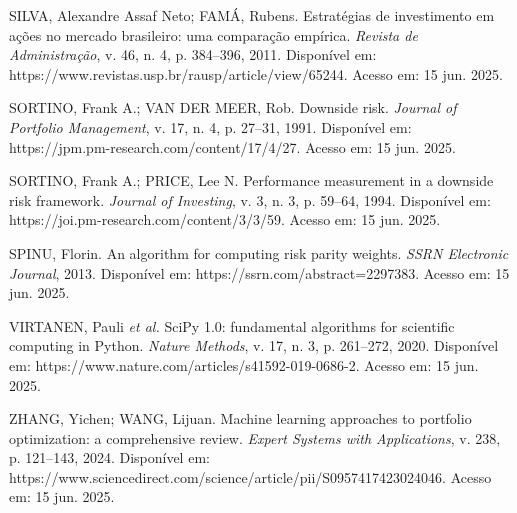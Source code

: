 \noindent
SILVA, Alexandre Assaf Neto; FAMÁ, Rubens. Estratégias de investimento em ações no mercado brasileiro: uma comparação empírica. \textit{Revista de Administração}, v. 46, n. 4, p. 384--396, 2011. Disponível em: https://www.revistas.usp.br/rausp/article/view/65244. Acesso em: 15 jun. 2025.

\noindent
SORTINO, Frank A.; VAN DER MEER, Rob. Downside risk. \textit{Journal of Portfolio Management}, v. 17, n. 4, p. 27--31, 1991. Disponível em: https://jpm.pm-research.com/content/17/4/27. Acesso em: 15 jun. 2025.

\noindent
SORTINO, Frank A.; PRICE, Lee N. Performance measurement in a downside risk framework. \textit{Journal of Investing}, v. 3, n. 3, p. 59--64, 1994. Disponível em: https://joi.pm-research.com/content/3/3/59. Acesso em: 15 jun. 2025.

\noindent
SPINU, Florin. An algorithm for computing risk parity weights. \textit{SSRN Electronic Journal}, 2013. Disponível em: https://ssrn.com/abstract=2297383. Acesso em: 15 jun. 2025.

\noindent
VIRTANEN, Pauli \textit{et al.} SciPy 1.0: fundamental algorithms for scientific computing in Python. \textit{Nature Methods}, v. 17, n. 3, p. 261--272, 2020. Disponível em: https://www.nature.com/articles/s41592-019-0686-2. Acesso em: 15 jun. 2025.

\noindent
ZHANG, Yichen; WANG, Lijuan. Machine learning approaches to portfolio optimization: a comprehensive review. \textit{Expert Systems with Applications}, v. 238, p. 121--143, 2024. Disponível em: https://www.sciencedirect.com/science/article/pii/S0957417423024046. Acesso em: 15 jun. 2025.
